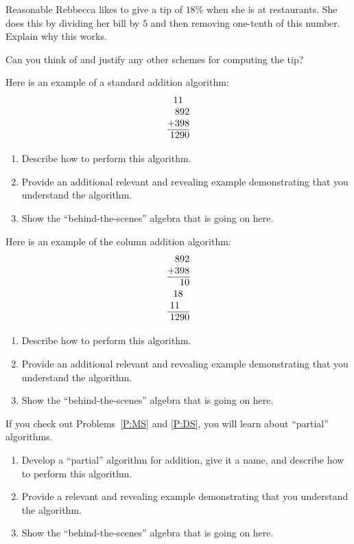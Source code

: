 \documentclass[nooutcomes]{ximera}
\begin{document}
\begin{problem}Reasonable Rebbecca likes to give a tip of $18$\% when she is at
  restaurants. She does this by dividing her bill by $5$ and then
  removing one-tenth of this number. Explain why this works.
\end{problem} 

\begin{problem}Can you think of and justify any other schemes for computing the
  tip?
\end{problem} 

\begin{problem}Here is an example of a standard addition algorithm:
\[
\begin{array}{@{}r@{}}
11~~\\
892\\
+398\\ \hline
1290
\end{array}
\]
\begin{enumerate}
\item Describe how to perform this algorithm.
\item Provide an additional relevant and revealing example
  demonstrating that you understand the algorithm.
\item Show the ``behind-the-scenes'' algebra that is going on here.
\end{enumerate}
\end{problem} 

\begin{problem}Here is an example of the column addition
  algorithm:
\[
\begin{array}{@{}r@{}}
892\\
+398\\ \hline
10\\
18~~\\
11~~~\\ \hline
1290
\end{array}
\]
\begin{enumerate}
\item Describe how to perform this algorithm.
\item Provide an additional relevant and revealing example
  demonstrating that you understand the algorithm.
\item Show the ``behind-the-scenes'' algebra that is going on here.
\end{enumerate}
\end{problem} 

\begin{problem}If you check out Problems~\ref{P:MS} and \ref{P:DS}, you will
  learn about ``partial'' algorithms.
\begin{enumerate}
\item Develop a ``partial'' algorithm for addition, give it a name, and describe how to
  perform this algorithm.
\item Provide a relevant and revealing example demonstrating that you
  understand the algorithm.
\item Show the ``behind-the-scenes'' algebra that is going on here.
\end{enumerate}
\end{problem} 
\end{document}
